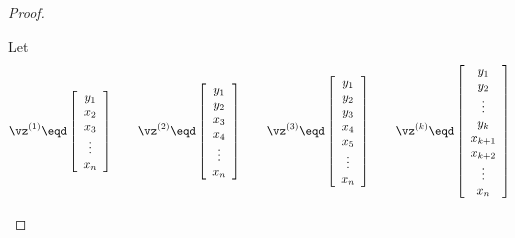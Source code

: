 {\begin{proof}
\begin{enumerate}
Let
\[
  \vz^{(1)} \eqd
  \left[\begin{array}{c}
    y_1 \\ x_2 \\ x_3 \\ \vdots \\  x_n
  \end{array}\right]
  \quad\quad
  \vz^{(2)}\eqd
  \left[\begin{array}{c}
    y_1 \\ y_2 \\ x_3 \\ x_4 \\ \vdots \\  x_n
  \end{array}\right]
  \quad\quad
  \vz^{(3)}\eqd
  \left[\begin{array}{c}
    y_1 \\ y_2 \\ y_3 \\ x_4 \\ x_5 \\ \vdots \\  x_n
  \end{array}\right]
  \quad\quad
  \vz^{(k)}\eqd
  \left[\begin{array}{c}
    y_1 \\ y_2 \\ \vdots \\ y_k \\ x_{k+1} \\ x_{k+2} \\ \vdots \\ x_n
  \end{array}\right]
\]


\end{enumerate}
\end{proof}}
